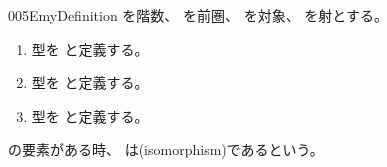 \documentclass[index]{subfiles}
\begin{document}
\begin{myBlock}{005E}{myDefinition}
  を階数、
  を前圏、
  を対象、
  を射とする。
  \begin{enumerate}
  \item 型を
    と定義する。
  \item 型を
    と定義する。
  \item 型を
    と定義する。
  \end{enumerate}
  の要素がある時、
  は(isomorphism)であるという。
\end{myBlock}
\end{document}
